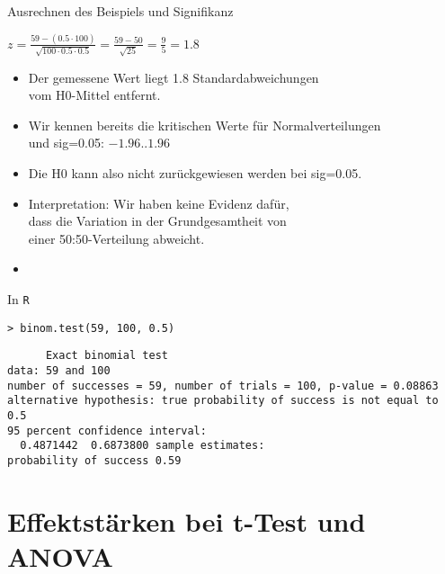 \begin{frame}
  {Ausrechnen des Beispiels und Signifikanz}
  \begin{center}
    $z=\frac{59-(0.5\cdot 100)}{\sqrt{100\cdot 0.5\cdot 0.5}}=\frac{59-50}{\sqrt{25}}=\frac{9}{5}=1.8$
  \end{center}
  \pause
  \begin{itemize}[<+->]
    \item Der gemessene Wert liegt 1.8 Standardabweichungen\\
      vom H0-Mittel entfernt.
    \item Wir kennen bereits die kritischen Werte für Normalverteilungen\\
      und sig=0.05: \alert{$-1.96 .. 1.96$}
    \item Die H0 kann also nicht zurückgewiesen werden bei sig=0.05.
      \Zeile
    \item \alert{Interpretation: Wir haben keine Evidenz dafür,\\
      dass die Variation in der Grundgesamtheit von\\
    einer 50:50-Verteilung abweicht.}
      \Zeile
    \item {}
  \end{itemize}
\end{frame}

\begin{frame}
  {In \texttt{R}}
  \begin{center}
    \texttt{> binom.test(59, 100, 0.5)}
  \end{center}
\tt\footnotesize
\ \ \ \ \ Exact binomial test\\[4ex]

data:  59 and 100\\
number of successes = 59, number of trials = 100, p-value = 0.08863\\
alternative hypothesis: true probability of success is not equal to 0.5\\
95 percent confidence interval:\\
\ \ 0.4871442\ \ 0.6873800
sample estimates:\\
probability of success 0.59 \\
\end{frame}

\section{Effektstärken bei t-Test und ANOVA}

